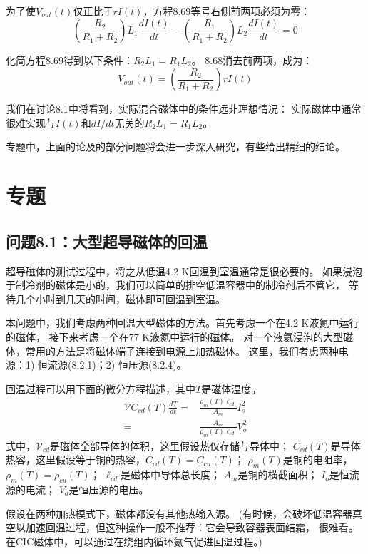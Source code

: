 为了使$V_{out}(t)$仅正比于$rI(t)$，方程8.69等号右侧前两项必须为零：
\begin{equation}%
\left(\frac{R_2}{R_1+R_2}\right)L_1\frac{dI(t)}{dt}-\left(\frac{R_1}{R_1+R_2}\right)L_2\frac{dI(t)}{dt}=0
\end{equation}

化简方程8.69得到以下条件：$R_2L_1=R_1L_2$。
8.68消去前两项，成为：
\begin{equation}%
V_{out}(t)=\left(\frac{R_2}{R_1+R_2}\right)rI(t)
\end{equation}

我们在讨论8.1中将看到，实际混合磁体中的条件远非理想情况：
实际磁体中通常很难实现与$I(t)$和$dI/dt$无关的$R_2L_1=R_1L_2$。

专题中，上面的论及的部分问题将会进一步深入研究，有些给出精细的结论。

\section{专题}

\subsection{问题8.1：大型超导磁体的回温}
超导磁体的测试过程中，将之从低温4.2 K回温到室温通常是很必要的。
如果浸泡于制冷剂的磁体是小的，我们可以简单的排空低温容器中的制冷剂后不管它，
等待几个小时到几天的时间，磁体即可回温到室温。

本问题中，我们考虑两种回温大型磁体的方法。首先考虑一个在4.2 K液氦中运行的磁体，
接下来考虑一个在77 K液氮中运行的磁体。
对一个液氦浸泡的大型磁体，常用的方法是将磁体端子连接到电源上加热磁体。
这里，我们考虑两种电源：1) 恒流源(8.2.1)；2) 恒压源(8.2.4)。

回温过程可以用下面的微分方程描述，其中$T$是磁体温度。
\begin{subequations}
	\begin{align}
\mathcal{V}C_{cd}(T)\frac{dT}{dt}=&\frac{\rho_m(T)\ell_{cd}}{A_m}I_{o}^{2} \\
=&\frac{A_m}{\rho_m(T)\ell_{cd}}V_{o}^{2}
	\end{align}
\end{subequations}
式中，$\mathcal{V}_{cd}$是磁体全部导体的体积，这里假设热仅存储与导体中；
$C_{cd}(T)$是导体热容，这里假设等于铜的热容，$C_{cd}(T)=C_{cu}(T)$；
$\rho_m(T)$是铜的电阻率，$\rho_m(T)=\rho_{cu}(T)$；
$\ell_{cd}$是磁体中导体总长度；
$A_m$是铜的横截面积；
$I_o$是恒流源的电流；
$V_o$是恒压源的电压。

假设在两种加热模式下，磁体都没有其他热输入源。
(有时候，会破坏低温容器真空以加速回温过程，但这种操作一般不推荐：它会导致容器表面结霜，
很难看。在CIC磁体中，可以通过在绕组内循环氦气促进回温过程。)

